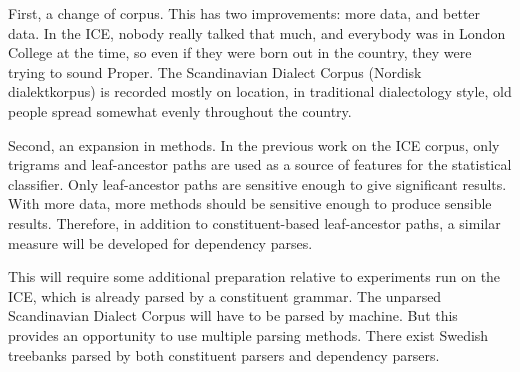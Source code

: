 \documentclass[11pt]{article}
\begin{document}
First, a change of corpus. This
has two improvements: more data, and better data. In the ICE, nobody
really talked that much, and everybody was in London College at the
time, so even if they were born out in the country, they were trying
to sound Proper. The Scandinavian Dialect Corpus
(Nordisk dialektkorpus) is recorded mostly on location, in traditional
dialectology style, old people spread somewhat evenly throughout the
country.

Second, an expansion in methods. In the previous work on the ICE
corpus, only trigrams and leaf-ancestor paths are used as a source of
features for the statistical classifier. Only leaf-ancestor paths are
sensitive enough to give significant results. With more data, more
methods should be sensitive enough to produce sensible
results. Therefore, in addition to constituent-based leaf-ancestor
paths, a similar measure will be developed for dependency parses.

This will require some additional preparation relative to experiments
run on the ICE, which is already parsed by a constituent grammar. The
unparsed Scandinavian Dialect Corpus will have to be parsed by
machine. But this provides an opportunity to use multiple parsing
methods. There exist Swedish treebanks parsed by both constituent parsers and
dependency parsers.
\end{document}
